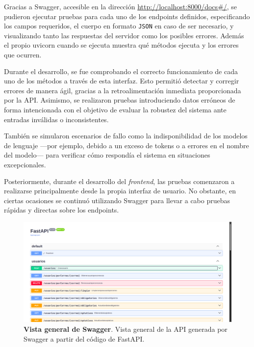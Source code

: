 Gracias a Swagger, accesible en la dirección \href{http://localhost:8000/docs\#/}{http://localhost:8000/docs\#/}, se pudieron ejecutar pruebas para cada uno de los endpoints definidos, especificando los campos requeridos, el cuerpo en formato \texttt{JSON} en caso de ser necesario, y visualizando tanto las respuestas del servidor como los posibles errores. Además el propio uvicorn cuando se ejecuta muestra qué métodos ejecuta y los errores que ocurren.

Durante el desarrollo, se fue comprobando el correcto funcionamiento de cada uno de los métodos a través de esta interfaz. Esto permitió detectar y corregir errores de manera ágil, gracias a la retroalimentación inmediata proporcionada por la API. Asimismo, se realizaron pruebas introduciendo datos erróneos de forma intencionada con el objetivo de evaluar la robustez del sistema ante entradas inválidas o inconsistentes.

También se simularon escenarios de fallo como la indisponibilidad de los modelos de lenguaje —por ejemplo, debido a un exceso de tokens o a errores en el nombre del modelo— para verificar cómo respondía el sistema en situaciones excepcionales.

Posteriormente, durante el desarrollo del \textit{frontend}, las pruebas comenzaron a realizarse principalmente desde la propia interfaz de usuario. No obstante, en ciertas ocasiones se continuó utilizando Swagger para llevar a cabo pruebas rápidas y directas sobre los endpoints.

\begin{figure}[H]
	\centering
	\includegraphics[width=1\linewidth]{imagenes/swagger1.png}
	\caption[\textbf{Vista general de Swagger}.]{\textbf{Vista general de Swagger}. Vista general de la API generada por Swagger a partir del código de FastAPI.}
	\label{swagger-1}
\end{figure}

